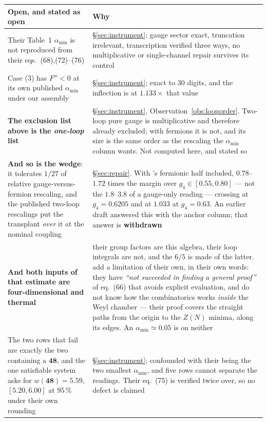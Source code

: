 \documentclass[11pt,a4paper]{article}
\newcommand{\rep}[1]{\mathbf{#1}}
\newcommand{\amin}{\alpha_{\min}}
\begin{document}
\begin{longtable}{p{}p{}}
\midrule
\rowcolor{hdrblue!10}\textbf{Open, and stated as open} & \textbf{Why}\\
\midrule
Their Table~1 $\amin$ is not reproduced from their eqs.~(68),(72)--(76) & \S\ref{sec:instrument};
gauge sector exact, truncation irrelevant, transcription verified three ways, no multiplicative or
single-channel repair survives its control\\
Case (3) has $F''<0$ at its own published $\amin$ under our assembly & \S\ref{sec:instrument}; exact
to 30 digits, and the inflection is at $1.133\times$ that value\\
\rowcolor{hdrblue!7}\textbf{The exclusion list above is the \emph{one-loop} list} &
\S\ref{sec:instrument}, Observation~\ref{obs:looporder}. Two-loop pure gauge is multiplicative and
therefore already excluded; with fermions it is not, and its size is the same order as the
rescaling the $\amin$ column wants. Not computed here, and stated so\\
\rowcolor{warmred!12}\textbf{And so is the wedge}: it tolerates $1/27$ of relative
gauge-versus-fermion rescaling, and the published two-loop rescalings put the transplant
\emph{over} it at the nominal coupling &
\S\ref{sec:repair}. With \cite{GuoDu}'s fermionic half included, $0.78$--$1.72$ times the margin
over $g_4\in[0.55,0.80]$ --- not the $1.8$--$3.8$ of a gauge-only reading --- crossing at
$g_4=0.6205$ and at $1.033$ at $g_4=0.63$. An earlier draft answered this with the anchor column;
that answer is \textbf{withdrawn}\\
\rowcolor{warmred!12}\textbf{And both inputs of that estimate are four-dimensional and thermal} &
their group factors are this algebra, their loop integrals are not, and the $6/5$ is made of the
latter. \cite{DGKA} add a limitation of their own, in their own words: they have \emph{``not
succeeded in finding a general proof''} of eq.~(66) that avoids explicit evaluation, and do not know
how the combinatorics works \emph{inside} the Weyl chamber --- their proof covers the straight paths
from the origin to the $Z(N)$ minima, along its edges. An $\amin\simeq0.05$ is on neither\\
The two rows that fail are exactly the two containing a $\rep{48}$, and the one satisfiable system
asks for $w(\rep{48})=5.59$, $[5.20,6.00]$ at $95\,\%$ under their own rounding &
\S\ref{sec:instrument}; confounded with their being the two smallest $\amin$, and five rows cannot
separate the readings. Their eq.~(75) is verified twice over, so no defect is claimed\\

\end{longtable}
\end{document}
